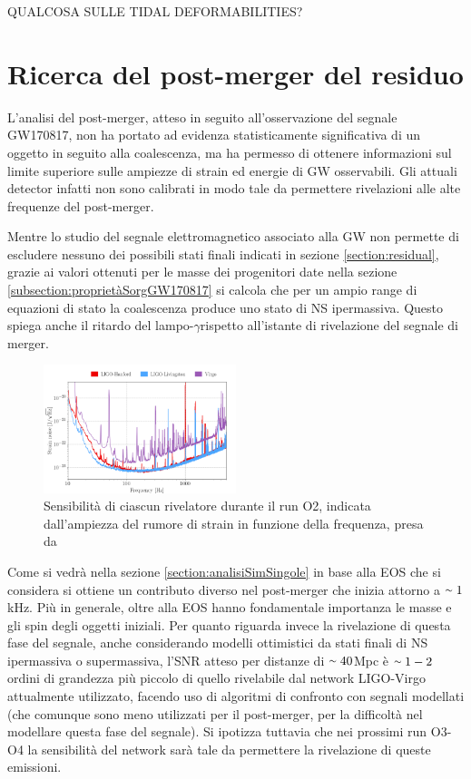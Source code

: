 QUALCOSA SULLE TIDAL DEFORMABILITIES?
\section{Ricerca del post-merger del residuo}
\label{section:postmergerGW170817}
L'analisi del post-merger, atteso in seguito all'osservazione del segnale GW170817, non ha portato ad evidenza statisticamente significativa di un oggetto in seguito alla coalescenza, ma ha permesso di ottenere informazioni sul limite superiore sulle ampiezze di strain ed energie di GW osservabili. Gli attuali detector infatti non sono calibrati in modo tale da permettere rivelazioni alle alte frequenze del post-merger.

Mentre lo studio del segnale elettromagnetico associato alla GW non permette di escludere nessuno dei possibili stati finali indicati in sezione \ref{section:residual}, grazie ai valori ottenuti per le masse dei progenitori date nella sezione \ref{subsection:proprietàSorgGW170817} si calcola che per un ampio range di equazioni di stato la coalescenza produce uno stato di NS ipermassiva. Questo spiega anche il ritardo del lampo-$\gamma$rispetto all'istante di rivelazione del segnale di merger. 

\begin{figure}
	\vspace{-15pt}
	\begin{center}
		\includegraphics[width=0.5\textwidth]{figures/Capitolo_2/noiseData.png}
	\end{center}
	\vspace{-10pt}
	\caption{Sensibilità di ciascun rivelatore durante il run O2, indicata dall'ampiezza del rumore di strain in funzione della frequenza, presa da \cite{Abbott_2019}}
	\label{fig:NoiseFrequenze}
	\vspace{-10pt}
\end{figure}
Come si vedrà nella sezione \ref{section:analisiSimSingole} in base alla EOS che si considera si ottiene un contributo diverso nel post-merger che inizia attorno a $\smallsim1$kHz. Più in generale, oltre alla EOS hanno fondamentale importanza le masse e gli spin degli oggetti iniziali. 
Per quanto riguarda invece la rivelazione di questa fase del segnale, anche considerando modelli ottimistici da stati finali di NS ipermassiva o supermassiva, l'SNR atteso per distanze di $\smallsim40$Mpc è $\smallsim1-2$ ordini di grandezza più piccolo di quello rivelabile dal network LIGO-Virgo attualmente utilizzato, facendo uso di algoritmi di confronto con segnali modellati (che comunque sono meno utilizzati per il post-merger, per la difficoltà nel modellare questa fase del segnale).
Si ipotizza tuttavia che nei prossimi run O3-O4 la sensibilità del network sarà tale da permettere la rivelazione di queste emissioni.


